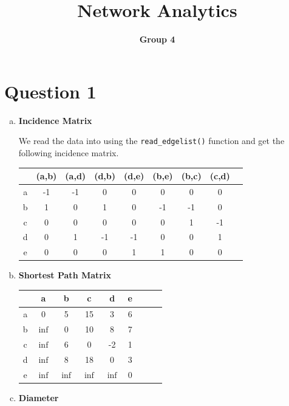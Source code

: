 \documentclass[a4paper]{article}
\begin{document}
\title{Network Analytics}
\author{\bf Group 4}
\maketitle
\section*{Question 1}

\begin{enumerate}[(a)]
\item \textbf{Incidence Matrix}

We read the data into using the \texttt{read\_edgelist()} function and get the following incidence matrix.
\begin{table}[ht]
\begin{center}
\begin{tabular}{c|cccccccc}
& (a,b) & (a,d) & (d,b) & (d,e) & (b,e) &(b,c) & (c,d)\\
\hline
a & -1 & -1 	& 0 	& 0 	& 0	& 0	&0\\
b &1 	& 0	& 1 	& 0	& -1	& -1	& 0\\
c &0 	& 0 	& 0 	& 0	&0	&1	&-1\\
d & 0 	& 1 	& -1 	& -1	& 0	&0	&1\\
e & 0 	& 0 	& 0 	& 1	& 1	&0	&0\\

\end{tabular}
\end{center}
\end{table}

\item \textbf{Shortest Path Matrix}

\begin{table}[ht]
\begin{center}
\begin{tabular}{c|cccccccc}
& a & b & c & d & e\\
\hline
a & 0 		& 5	& 15	& 3 	& 6\\
b &$\inf$ 	& 0	& 10 	& 8	& 7\\
c &$\inf$ 	& 6 	& 0 	& -2	& 1\\
d &$\inf$ 	& 8 	& 18 	& 0	& 3\\
e &$\inf$ 	&$\inf$& $\inf$& $\inf$	& 0
\end{tabular}
\end{center}
\end{table}

\item \textbf{Diameter}


\end{enumerate}
\end{document}
